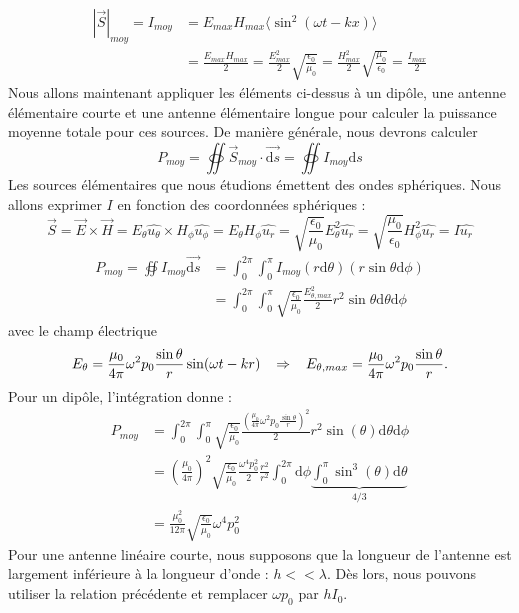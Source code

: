 \[\begin{split}
|\vec{S}|_{moy}=I_{moy}&=E_{max}H_{max}\langle \sin^2(\omega t-kx)\rangle \\ &=\frac{E_{max}H_{max}}{2}=\frac{E_{max}^2}{2}\sqrt{\frac{\epsilon_0}{\mu_0}}=\frac{H_{max}^2}{2}\sqrt{\frac{\mu_0}{\epsilon_0}}=\frac{I_{max}}{2}
\end{split}\]
Nous allons maintenant appliquer les éléments ci-dessus à un dipôle, une antenne élémentaire courte et une antenne élémentaire longue pour calculer la puissance moyenne totale pour ces sources. De manière générale, nous devrons calculer 
$$P_{moy}=\oiint \vec{S}_{moy} \cdot \vec{\textrm{d}s} = \oiint I_{moy}\textrm{d}s$$
Les sources élémentaires que nous étudions émettent des ondes sphériques. Nous allons exprimer $I$ en fonction des coordonnées sphériques : 
$$\vec{S}=\vec{E}\times \vec{H}=E_\theta\hat{u_\theta} \times H_\phi\hat{u_\phi}=E_\theta H_\phi\hat{u_r}=\sqrt{\frac{\epsilon_0}{\mu_0}}E_\theta^2\hat{u_r}=\sqrt{\frac{\mu_0}{\epsilon_0}}H_\phi^2\hat{u_r}=I\hat{u_r}$$
\begin{equation}\begin{split}
P_{moy} = \oiint I_{moy}\vec{\textrm{d}s} &= \int_0^{2\pi}\int_0^{\pi} I_{moy}(r\textrm{d}\theta)(r\sin\theta\textrm{d}\phi)\\
&=\int_0^{2\pi}\int_0^{\pi}\sqrt{\frac{\epsilon_{0}}{\mu_0}}\frac{E_{\theta,max}^2}{2}r^2\sin\theta\textrm{d}\theta\textrm{d}\phi
\end{split}\end{equation}
avec le champ électrique
\[E_\theta=\frac{\mu_0}{4\pi}\omega^2p_0\frac{\sin \theta}{r}\sin(\omega t-kr) \hspace{3mm} \Rightarrow \hspace{3mm} E_{\theta,max}=\frac{\mu_0}{4\pi}\omega^2p_0\frac{\sin \theta}{r}.\]
Pour un dipôle, l'intégration donne :
\[\begin{split}
P_{moy}  &= \int_0^{2\pi}\int_0^{\pi} \sqrt{\frac{\epsilon_{0}}{\mu_0}} \frac{\left(\frac{\mu_0}{4\pi}\omega^2p_0\frac{\sin \theta}{r}\right)^2}{2}r^2\sin(\theta) \textrm{d}\theta \textrm{d}\phi \\
&=\left(\frac{\mu_0}{4\pi}\right)^2\sqrt{\frac{\epsilon_{0}}{\mu_0}}\frac{\omega^4p_0^2}{2}\frac{r^2}{r^2}\int_0^{2\pi}\textrm{d}\phi \underbrace{\int_0^{\pi}\sin^3(\theta) \textrm{d}\theta}_{4/3} \\
&=\frac{\mu_0^2}{12\pi}\sqrt{\frac{\epsilon_{0}}{\mu_0}}\omega^4p_0^2\end{split}
\]
Pour une antenne linéaire courte, nous supposons que la longueur de l'antenne est largement inférieure à la longueur d'onde : $h<<\lambda$. Dès lors, nous pouvons utiliser la relation précédente et remplacer $\omega p_0$ par $hI_0$.
